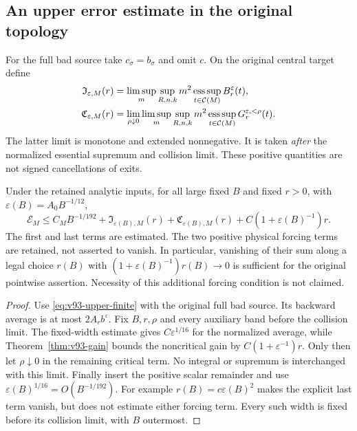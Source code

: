 \subsection{An upper error estimate in the original topology}
For the full bad source take $c_\sigma=b_\sigma$ and omit $c$.
On the original central target define
\begin{align}
 \mathfrak I_{\varepsilon,M}(r)
   &=\limsup_m\sup_{R,n,k}m^2\esssup_{t\in\mathcal C(M)}
                                        B_r^\varepsilon(t),\notag\\
 \mathfrak C_{\varepsilon,M}(r)
   &=\lim_{\rho\downarrow0}\limsup_m\sup_{R,n,k}m^2
        \esssup_{t\in\mathcal C(M)}G_r^{\varepsilon,<\rho}(t).
                                             \label{eq:v93-forcing-charges}
\end{align}
The latter limit is monotone and extended nonnegative. It is taken
\emph{after} the normalized essential supremum and collision limit.
These positive quantities are not signed cancellations of exits.

\begin{theorem}
\label{thm:v93-upper-endpoint}
Under the retained analytic inputs, for all large fixed $B$ and fixed
$r>0$, with $\varepsilon(B)=A_0B^{-1/12}$,
\begin{equation}\label{eq:v93-endpoint}
 \mathcal E_M\le C_MB^{-1/192}
       +\mathfrak I_{\varepsilon(B),M}(r)
       +\mathfrak C_{\varepsilon(B),M}(r)
       +C(1+\varepsilon(B)^{-1})r.
\end{equation}
The first and last terms are estimated. The two positive physical
forcing terms are retained, not asserted to vanish. In particular,
vanishing of their sum along a legal choice $r(B)$ with
$(1+\varepsilon(B)^{-1})r(B)\to0$ is sufficient for the original
pointwise assertion. Necessity of this additional forcing condition
is not claimed.
\end{theorem}
\begin{proof}
Use \eqref{eq:v93-upper-finite} with the original full bad source.
Its backward average is at most $2A_rb^\varepsilon$. Fix
$B,r,\rho$ and every auxiliary band before the collision limit.
The fixed-width estimate gives $C\varepsilon^{1/16}$ for the
normalized average, while Theorem~\ref{thm:v93-gain} bounds the
noncritical gain by $C(1+\varepsilon^{-1})r$. Only then let
$\rho\downarrow0$ in the remaining critical term. No integral or
supremum is interchanged with this limit. Finally insert the positive
scalar remainder and use
$\varepsilon(B)^{1/16}=O(B^{-1/192})$.
For example $r(B)=c\varepsilon(B)^2$ makes the explicit last term
vanish, but does not estimate either forcing term. Every such width
is fixed before its collision limit, with $B$ outermost.
\end{proof}

